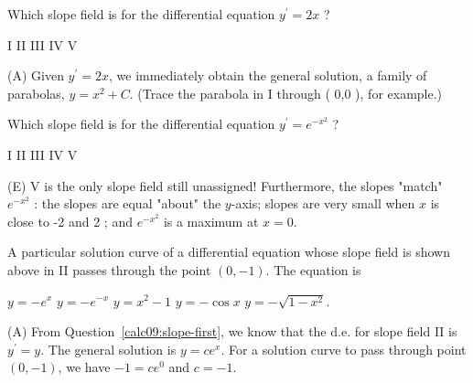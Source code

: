 \question
Which slope field is for the differential equation $y^{\prime}=2 x$ ?
\begin{choices}
  \CorrectChoice I
  \choice II
  \choice III
  \choice IV
  \choice V
\end{choices}
\begin{solution}
(A) Given $y^{\prime}=2 x$, we immediately obtain the general solution, a family of parabolas, $y=x^{2}+C$. (Trace the parabola in I through ( 0,0 ), for example.)
\end{solution}




\newpage



\question\label{calc09:slope-last}
Which slope field is for the differential equation $y^{\prime}=e^{-x^{2}}$ ?
\begin{choices}
  \choice I
  \choice II
  \choice III
  \choice IV
  \CorrectChoice V
\end{choices}
\begin{solution}
(E) V is the only slope field still unassigned! Furthermore, the slopes "match" $e^{-x^{2}}$ : the slopes are equal "about" the $y$-axis; slopes are very small when $x$ is close to -2 and 2 ; and $e^{-x^{2}}$ is a maximum at $x=0$.
\end{solution}




\newpage



\question
A particular solution curve of a differential equation whose slope field is shown above in II passes through the point $(0,-1)$. The equation is
\begin{choices}
  \CorrectChoice $y=-e^{x}$
  \choice $y=-e^{-x}$
  \choice $y=x^{2}-1$
  \choice $y=-\cos x$
  \choice $y=-\sqrt{1-x^{2}}$.
\end{choices}
\begin{solution}
(A) From Question~\ref{calc09:slope-first}, we know that the d.e. for slope field II is $y^{\prime}=y$. The general solution is $y=c e^{x}$. For a solution curve to pass through point $(0,-1)$, we have $-1=c e^{0}$ and $c=-1$.
\end{solution}

